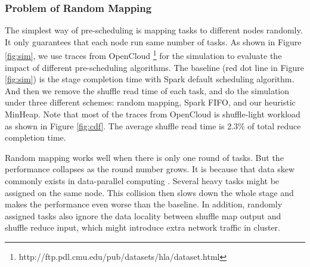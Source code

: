 \subsubsection{Problem of Random Mapping}\label{randomassign}
The simplest way of pre-scheduling is mapping tasks to different nodes randomly. It only guarantees that each node run same number of tasks. 
As shown in Figure \ref{fig:sim}, we use traces from OpenCloud \footnote{\label{fn:trace}http://ftp.pdl.cmu.edu/pub/datasets/hla/dataset.html} for the simulation to evaluate the impact of different pre-scheduling algorithms. The baseline (red dot line in Figure \ref{fig:sim}) is the stage completion time with Spark default scheduling algorithm. And then we remove the shuffle read time of each task, and do the simulation under three different schemes: random mapping, Spark FIFO, and our heuristic MinHeap.
Note that most of the traces from OpenCloud is shuffle-light workload as shown in Figure \ref{fig:cdf}. The average shuffle read time is 2.3\% of total reduce completion time.

Random mapping works well when there is only one round of tasks. But the performance collapses as the round number grows. It is because that data skew commonly exists in data-parallel computing \cite{skewtune, reining, gufler2012load}. Several heavy tasks might be assigned on the same node. This collision then slows down the whole stage and makes the performance even worse than the baseline. In addition, randomly assigned tasks also ignore the data locality between shuffle map output and shuffle reduce input, which might introduce extra network traffic in cluster.

